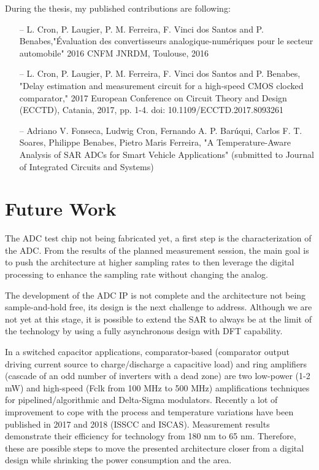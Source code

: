 During the thesis, my published contributions are following:
\begin{itemize}
    \item[--] L. Cron, P. Laugier, P. M. Ferreira, F. Vinci dos Santos and P. Benabes,"Évaluation des convertisseurs analogique-numériques pour le secteur automobile" 2016 CNFM JNRDM, Toulouse, 2016
    \item[--] L. Cron, P. Laugier, P. M. Ferreira, F. Vinci dos Santos and P. Benabes, "Delay estimation and measurement circuit for a high-speed CMOS clocked comparator," 2017 European Conference on Circuit Theory and Design (ECCTD), Catania, 2017, pp. 1-4. doi: 10.1109/ECCTD.2017.8093261
    \item[--] Adriano V. Fonseca, Ludwig Cron, Fernando A. P. Barúqui,
    Carlos F. T. Soares, Philippe Benabes, Pietro Maris Ferreira, "A Temperature-Aware Analysis of SAR ADCs for Smart Vehicle Applications" (submitted to Journal of Integrated Circuits and Systems)
\end{itemize}

\clearpage
\section{Future Work}          %
The ADC test chip not being fabricated yet, a first step is the characterization of the ADC\@. From the results of the planned measurement session, the main goal is to push the architecture at higher sampling rates to then leverage the digital processing to enhance the sampling rate without changing the analog.

The development of the ADC IP is not complete and the architecture not being sample-and-hold free, its design is the next challenge to address. Although we are not yet at this stage, it is possible to extend the SAR to always be at the limit of the technology by using a fully asynchronous design with DFT capability.

In a switched capacitor applications, comparator-based (comparator output driving current source to charge/discharge a capacitive load) and ring amplifiers (cascade of an odd number of inverters with a dead zone) are two low-power (1-2 mW) and high-speed (Fclk from 100 MHz to 500 MHz) amplifications techniques for pipelined/algorithmic and Delta-Sigma modulators. Recently a lot of improvement to cope with the process and temperature variations have been published in 2017 and 2018 (ISSCC and ISCAS). Measurement results demonstrate their efficiency for technology from 180 nm to 65 nm. Therefore, these are possible steps to move the presented architecture closer from a digital design while shrinking the power consumption and the area.

